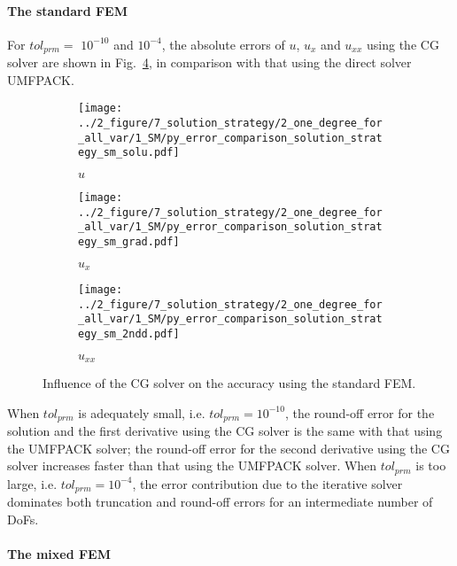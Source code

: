 \documentclass[review,3p]{elsarticle}
\begin{document}
\paragraph{The standard FEM}

For $tol_{prm}=$ $10^{-10}$ and $10^{-4}$, the absolute errors of $u$, $u_{x}$ and $u_{xx}$ using the CG solver are shown in Fig.~\ref{py_bench_Pois_SM_error_solution_strategy}, in comparison with that using the direct solver UMFPACK. 

\begin{figure}[!ht]
    \begin{subfigure}{5.5cm}
        \texttt{[image: ../2\_figure/7\_solution\_strategy/2\_one\_degree\_for\_all\_var/1\_SM/py\_error\_comparison\_solution\_strategy\_sm\_solu.pdf]}
        \caption{$u$}
        \label{py_bench_Pois_SM_error_solution_strategy_solu}
    \end{subfigure}
    \hspace{-0.2cm}
    \begin{subfigure}{5.5cm}
        \texttt{[image: ../2\_figure/7\_solution\_strategy/2\_one\_degree\_for\_all\_var/1\_SM/py\_error\_comparison\_solution\_strategy\_sm\_grad.pdf]}
        \caption{$u_x$}
        \label{py_bench_Pois_SM_error_solution_strategy_grad}
    \end{subfigure}
    \hspace{-0.2cm}
    \begin{subfigure}{5.5cm}
        \texttt{[image: ../2\_figure/7\_solution\_strategy/2\_one\_degree\_for\_all\_var/1\_SM/py\_error\_comparison\_solution\_strategy\_sm\_2ndd.pdf]}
        \caption{$u_{xx}$}
        \label{py_bench_Pois_SM_error_solution_strategy_2ndd}
    \end{subfigure}
\caption{Influence of the CG solver on the accuracy using the standard FEM.}
\label{py_bench_Pois_SM_error_solution_strategy}
\end{figure}

When $tol_{prm}$ is adequately small, i.e. $tol_{prm}=10^{-10}$, the round-off error for the solution and the first derivative using the CG solver is the same with that using the UMFPACK solver; the round-off error for the second derivative using the CG solver increases faster than that using the UMFPACK solver.
When $tol_{prm}$ is too large, i.e. $tol_{prm}=10^{-4}$, the error contribution due to the iterative solver dominates both truncation and round-off errors for an intermediate number of DoFs. 

\paragraph{The mixed FEM}
\end{document}
